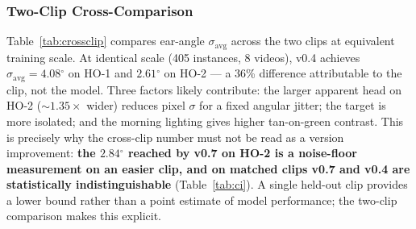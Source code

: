 \documentclass[11pt]{article}
\newcommand{\dgr}{\ensuremath{^{\circ}}}
\newcommand{\sigavg}{\ensuremath{\sigma_{\text{avg}}}}
\begin{document}
\subsubsection{Two-Clip Cross-Comparison}
\label{sec:crossclip}
Table~\ref{tab:crossclip} compares ear-angle $\sigavg$ across the two clips at
equivalent training scale. At identical scale (405 instances, 8 videos), v0.4
achieves $\sigavg = 4.08\dgr$ on HO-1 and $2.61\dgr$ on HO-2
--- a 36\% difference attributable to the clip, not the model. Three factors
likely contribute: the larger apparent head on HO-2
(${\sim}1.35\times$ wider) reduces pixel $\sigma$ for a fixed angular jitter; the
target is more isolated; and the morning lighting gives higher tan-on-green
contrast. This is precisely why the cross-clip number must not be read as a
version improvement: \textbf{the $2.84\dgr$ reached by v0.7 on HO-2
is a noise-floor measurement on an easier clip, and on matched clips v0.7 and
v0.4 are statistically indistinguishable} (Table~\ref{tab:ci}). A single
held-out clip provides a lower bound rather than a point estimate of model
performance; the two-clip comparison makes this explicit.
\end{document}
